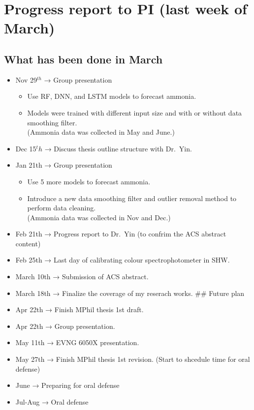 \documentclass[
]{article}
\author{}
\date{}
\providecommand{\tightlist}{%
  \setlength{\itemsep}{0pt}\setlength{\parskip}{0pt}}
\begin{document}
\hypertarget{progress-report-to-pi-last-week-of-march}{%
\section{Progress report to PI (last week of
March)}\label{progress-report-to-pi-last-week-of-march}}

\hypertarget{what-has-been-done-in-march}{%
\subsection{What has been done in
March}\label{what-has-been-done-in-march}}

\begin{itemize}
\tightlist
\item
  Nov 29\(^{th}\) → Group presentation

  \begin{itemize}
  \tightlist
  \item
    Use RF, DNN, and LSTM models to forecast ammonia.
  \item
    Models were trained with different input size and with or without
    data smoothing filter.\\
    (Ammonia data was collected in May and June.)
  \end{itemize}
\item
  Dec 15\({^th}\) → Discuss thesis outline structure with Dr.~Yin.
\item
  Jan 21th → Group presentation

  \begin{itemize}
  \tightlist
  \item
    Use 5 more models to forecast ammonia.
  \item
    Introduce a new data smoothing filter and outlier removal method to
    perform data cleaning.\\
    (Ammonia data was collected in Nov and Dec.)
  \end{itemize}
\item
  Feb 21th → Progress report to Dr.~Yin (to confrim the ACS abstract
  content)
\item
  Feb 25th → Last day of calibrating colour spectrophotometer in SHW.
\item
  March 10th → Submission of ACS abstract.
\item
  March 18th → Finalize the coverage of my reserach works. \#\# Future
  plan
\item
  Apr 22th → Finish MPhil thesis 1st draft.
\item
  Apr 22th → Group presentation.
\item
  May 11th → EVNG 6050X presentation.
\item
  May 27th → Finish MPhil thesis 1st revision. (Start to shcedule time
  for oral defense)
\item
  June → Preparing for oral defense
\item
  Jul-Aug → Oral defense
\end{itemize}
\end{document}
